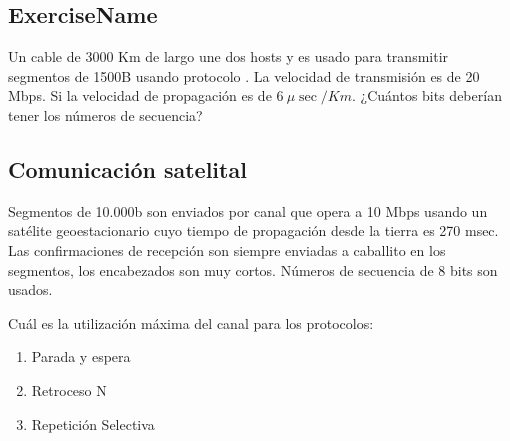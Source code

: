 \documentclass[12pt]{report}
\begin{document}
\begin{exer}
	\subsection{ExerciseName \sfour}
	Un cable de 3000 Km de largo une dos hosts y es usado para transmitir segmentos de
	1500B usando protocolo . La velocidad de transmisión es de 20 Mbps. Si la
	velocidad de propagación es de $6\ \mu \sec/Km$. ¿Cuántos bits deberían tener los números de secuencia?
\end{exer}

\begin{exer}
	\subsection{Comunicación satelital \sthree}
	Segmentos de 10.000b son enviados por canal que opera a 10 Mbps usando un
	satélite geoestacionario cuyo tiempo de propagación desde la tierra es 270 msec. Las
	confirmaciones de recepción son siempre enviadas a caballito en los segmentos, los encabezados
	son muy cortos.
	Números de secuencia de 8 bits son usados.

	Cuál es la utilización máxima del canal para los protocolos:
	\begin{enumerate}
		\item Parada y espera
		\item Retroceso N
		\item Repetición Selectiva
	\end{enumerate}
\end{exer}
\end{document}
